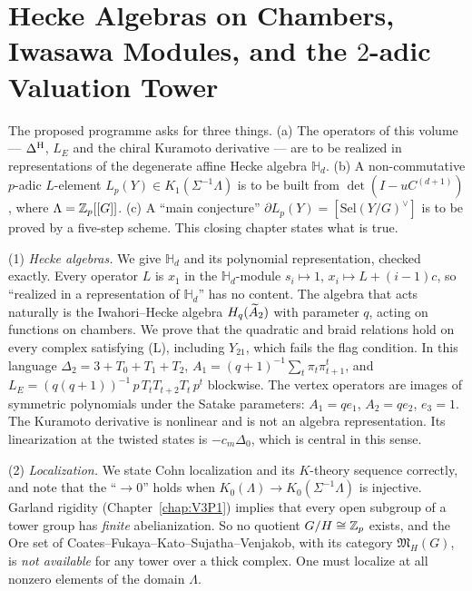 ﻿%
\chapter{Hecke Algebras on Chambers, Iwasawa Modules, and the \texorpdfstring{$2$}{2}-adic Valuation Tower}\label{chap:V3P6}
\begin{chapterabstract}
The proposed programme asks for three things. (a) The operators of this volume --- $\Delta^{\mathrm{H}}$, $L_E$
and the chiral Kuramoto derivative --- are to be realized in representations of the degenerate
affine Hecke algebra $\mathbb H_d$. (b) A non-commutative $p$-adic $L$-element $L_p(Y)\in
K_1(\Sigma^{-1}\Lambda)$ is to be built from $\det(I-uC^{(d+1)})$, where $\Lambda=\mathbb{Z}_p[[G]]$.
(c) A ``main conjecture'' $\partial L_p(Y)=[\mathrm{Sel}(Y/G)^{\vee}]$ is to be proved by a
five-step scheme. This closing chapter states what is true.

(1) \emph{Hecke algebras.} We give $\mathbb H_d$ and its polynomial representation, checked
exactly. Every operator $L$ is $x_1$ in the $\mathbb H_d$-module $s_i\mapsto1$, $x_i\mapsto
L+(i-1)c$, so ``realized in a representation of $\mathbb H_d$'' has no content. The algebra that
acts naturally is the Iwahori--Hecke algebra $H_q(\widetilde A_2)$ with parameter $q$, acting on
functions on chambers. We prove that the quadratic and braid relations hold on every complex
satisfying (L), including $Y_{21}$, which fails the flag condition. In this language
$\Delta_2=3+T_0+T_1+T_2$, $A_1=(q+1)^{-1}\sum_t\pi_t\pi_{t+1}^{t}$, and
$L_E=(q(q+1))^{-1}\,p\,T_tT_{t+2}T_t\,p^{t}$ blockwise. The vertex operators are images of
symmetric polynomials under the Satake parameters: $A_1=qe_1$, $A_2=qe_2$, $e_3=1$. The
Kuramoto derivative is nonlinear and is not an algebra representation. Its linearization at the
twisted states is $-c_m\Delta_0$, which is central in this sense.

(2) \emph{Localization.} We state Cohn localization and its $K$-theory sequence correctly, and
note that the ``$\to0$'' holds when $K_0(\Lambda)\to K_0(\Sigma^{-1}\Lambda)$ is injective.
Garland rigidity (Chapter~\ref{chap:V3P1}) implies that every open subgroup of a tower group has \emph{finite}
abelianization. So no quotient $G/H\cong\mathbb{Z}_p$ exists, and the Ore set of
Coates--Fukaya--Kato--Sujatha--Venjakob, with its category $\mathfrak M_H(G)$, is \emph{not
available} for any tower over a thick complex. One must localize at all nonzero elements of the
domain $\Lambda$.


\end{chapterabstract}
